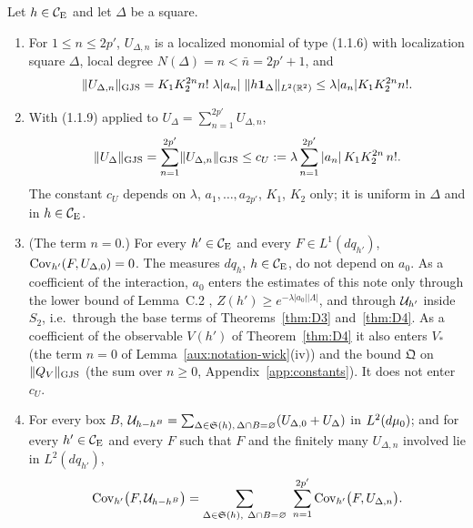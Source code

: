 \begin{auxlemma}\label{aux:notation-cU}
Let $h\in\mathcal{C}_{\mathrm E}$ and let $\Delta$ be a square.
\begin{enumerate}
\item[\textup{(i)}] For $1\le n\le2p'$, $U_{\Delta,n}$ is a localized monomial of type (1.1.6)
with localization square $\Delta$, local degree $N(\Delta)=n<\bar n=2p'+1$, and
\[
 \lVert U_{\Delta,n}\rVert_{\mathrm{GJS}}=K_1K_2^{2n}n!\;\lambda|a_n|\;\|h\mathbf 1_\Delta\|_{L^2(\mathbb{R}^2)}
 \le\lambda|a_n|K_1K_2^{2n}n! .
\]
\item[\textup{(ii)}] With (1.1.9) applied to $U_\Delta=\sum_{n=1}^{2p'}U_{\Delta,n}$,
\[
 \lVert U_\Delta\rVert_{\mathrm{GJS}}=\sum_{n=1}^{2p'}\lVert U_{\Delta,n}\rVert_{\mathrm{GJS}}\le c_U:=\lambda\sum_{n=1}^{2p'}|a_n|\,K_1K_2^{2n}\,n! .
\]
The constant $c_U$ depends on $\lambda$, $a_1,\dots,a_{2p'}$, $K_1$, $K_2$ only; it is
uniform in $\Delta$ and in $h\in\mathcal{C}_{\mathrm E}$.
\item[\textup{(iii)}] \textup{(The term $n=0$.)}  For every $h'\in\mathcal{C}_{\mathrm E}$ and every $F\in
L^1(dq_{h'})$, $\operatorname{Cov}_{h'}(F,U_{\Delta,0})=0$.  The measures $dq_h$, $h\in\mathcal{C}_{\mathrm E}$, do not depend
on $a_0$.  As a coefficient of the interaction, $a_0$ enters the estimates of this note only
through the lower bound of Lemma~C.2 \cite[p.~40]{R}, $Z(h')\ge e^{-\lambda|a_0||\Lambda|}$, and
through $\mathcal U_{h'}$ inside $S_2$, i.e.\ through the base terms of Theorems~\ref{thm:D3}
and~\ref{thm:D4}.  As a coefficient of the observable $V(h')$ of Theorem~\ref{thm:D4} it also
enters $V_*$ (the term $n=0$ of Lemma~\ref{aux:notation-wick}(iv)) and the bound $\mathfrak Q$ on
$\lVert Q_V\rVert_{\mathrm{GJS}}$ (the sum over $n\ge0$, Appendix~\ref{app:constants}).  It does not enter $c_U$.
\item[\textup{(iv)}] For every box $B$,
$\mathcal U_{h-h^B}=\sum_{\Delta\in\mathfrak S(h),\,\Delta\cap B=\varnothing}(U_{\Delta,0}+U_\Delta)$
in $L^2(d\mu_0)$; and for every $h'\in\mathcal{C}_{\mathrm E}$ and every $F$ such that $F$ and the finitely many
$U_{\Delta,n}$ involved lie in $L^2(dq_{h'})$,
\[
 \operatorname{Cov}_{h'}\bigl(F,\mathcal U_{h-h^B}\bigr)=\sum_{\Delta\in\mathfrak S(h),\ \Delta\cap B=\varnothing}\
 \sum_{n=1}^{2p'}\operatorname{Cov}_{h'}\bigl(F,U_{\Delta,n}\bigr) .
\]
\end{enumerate}
\end{auxlemma}

